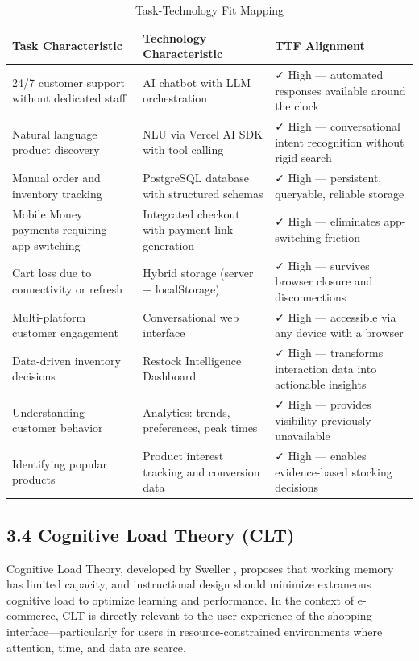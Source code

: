 \documentclass[12pt,a4paper]{article}
\begin{document}
\begin{table}[h]
\centering
\caption{Task-Technology Fit Mapping}
\label{tab:ttf}
\begin{tabular}{p{5cm}p{5cm}p{4cm}}
\toprule
\textbf{Task Characteristic} & \textbf{Technology Characteristic} & \textbf{TTF Alignment} \\
\midrule
24/7 customer support without dedicated staff & AI chatbot with LLM orchestration & ✓ High --- automated responses available around the clock \\
Natural language product discovery & NLU via Vercel AI SDK with tool calling & ✓ High --- conversational intent recognition without rigid search \\
Manual order and inventory tracking & PostgreSQL database with structured schemas & ✓ High --- persistent, queryable, reliable storage \\
Mobile Money payments requiring app-switching & Integrated checkout with payment link generation & ✓ High --- eliminates app-switching friction \\
Cart loss due to connectivity or refresh & Hybrid storage (server + localStorage) & ✓ High --- survives browser closure and disconnections \\
Multi-platform customer engagement & Conversational web interface & ✓ High --- accessible via any device with a browser \\
Data-driven inventory decisions & Restock Intelligence Dashboard & ✓ High --- transforms interaction data into actionable insights \\
Understanding customer behavior & Analytics: trends, preferences, peak times & ✓ High --- provides visibility previously unavailable \\
Identifying popular products & Product interest tracking and conversion data & ✓ High --- enables evidence-based stocking decisions \\
\bottomrule
\end{tabular}
\end{table}

\subsection{3.4 Cognitive Load Theory (CLT)}

Cognitive Load Theory, developed by Sweller \citep{sweller1988}, proposes that working memory has limited capacity, and instructional design should minimize extraneous cognitive load to optimize learning and performance. In the context of e-commerce, CLT is directly relevant to the user experience of the shopping interface---particularly for users in resource-constrained environments where attention, time, and data are scarce.
\end{document}
